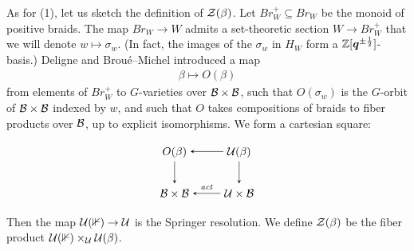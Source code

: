 \documentclass[a4paper,10pt,leqno]{amsart}
\theoremstyle{plain}
\theoremstyle{plain}
\theoremstyle{plain}
\theoremstyle{definition}
\theoremstyle{remark}
\newcommand{\Br}{\mathit{Br}}
\newcommand{\Q}{\bm{q}}
\newcommand{\act}{\mathit{act}}
\begin{document}
As for (1), let us sketch the definition of $\cal{Z}(\beta)$.
Let $\Br_W^+ \subseteq \Br_W$ be the monoid of positive braids.
The map $\Br_W \to W$ admits a set-theoretic section $W \to \Br_W^+$ that we will denote $w \mapsto \sigma_w$.
(In fact, the images of the $\sigma_w$ in $H_W$ form a $\bb{Z}[\Q^{\pm\frac{1}{2}}]$-basis.)
Deligne \cite{deligne_1997} and Brou\'e--Michel \cite{bm_1997} introduced a map
\begin{align}
\beta \mapsto O(\beta)
\end{align}
from elements of $\Br_W^+$ to $G$-varieties over $\cal{B} \times \cal{B}$, such that $O(\sigma_w)$ is the $G$-orbit of $\cal{B} \times \cal{B}$ indexed by $w$, and such that $O$ takes compositions of braids to fiber products over $\cal{B}$, up to explicit isomorphisms.
We form a cartesian square:
\begin{equation}
\begin{tikzpicture}[baseline=(current bounding box.center), >=stealth]
\matrix(m)[matrix of math nodes, row sep=2em, column sep=2.5em, text height=2ex, text depth=0.5ex]
{	O(\beta)
		&\cal{U}(\beta)\\
	\cal{B} \times \cal{B}
		&\cal{U} \times \cal{B}\\
		};
\path[->,font=\scriptsize, auto]
(m-1-2)		edge (m-1-1)
(m-1-2)		edge (m-2-2)
(m-1-1)		edge (m-2-1)
(m-2-2)		edge node[above]{$\act$} (m-2-1);
\end{tikzpicture}
\end{equation}
Then the map $\cal{U}(\bb{1}) \to \cal{U}$ is the Springer resolution.
We define $\cal{Z}(\beta)$ be the fiber product $\cal{U}(\bb{1}) \times_\cal{U} \cal{U}(\beta)$.
\end{document}
